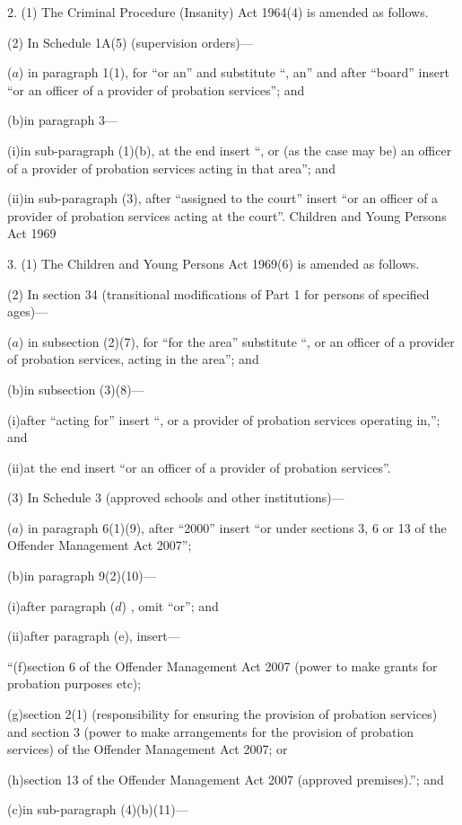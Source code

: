 \documentclass[12pt,a4paper]{article}
\begin{document}
2.  (1)  The Criminal Procedure (Insanity) Act 1964(4) is amended as follows.

(2) In Schedule 1A(5) (supervision orders)—

($a$) in paragraph 1(1), for “or an” and substitute “, an” and after “board” insert “or an officer of a provider of probation services”; and

(b)in paragraph 3—

(i)in sub-paragraph (1)(b), at the end insert “, or (as the case may be) an officer of a provider of probation services acting in that area”; and

(ii)in sub-paragraph (3), after “assigned to the court” insert “or an officer of a provider of probation services acting at the court”.
Children and Young Persons Act 1969

3.  (1)  The Children and Young Persons Act 1969(6) is amended as follows.

(2) In section 34 (transitional modifications of Part 1 for persons of specified ages)—

($a$) in subsection (2)(7), for “for the area” substitute “, or an officer of a provider of probation services, acting in the area”; and

(b)in subsection (3)(8)—

(i)after “acting for” insert “, or a provider of probation services operating in,”; and

(ii)at the end insert “or an officer of a provider of probation services”.

(3) In Schedule 3 (approved schools and other institutions)—

($a$) in paragraph 6(1)(9), after “2000” insert “or under sections 3, 6 or 13 of the Offender Management Act 2007”;

(b)in paragraph 9(2)(10)—

(i)after paragraph ($d$) , omit “or”; and

(ii)after paragraph (e), insert—

“(f)section 6 of the Offender Management Act 2007 (power to make grants for probation purposes etc);

(g)section 2(1) (responsibility for ensuring the provision of probation services) and section 3 (power to make arrangements for the provision of probation services) of the Offender Management Act 2007; or

(h)section 13 of the Offender Management Act 2007 (approved premises).”; and

(c)in sub-paragraph (4)(b)(11)—
\end{document}
